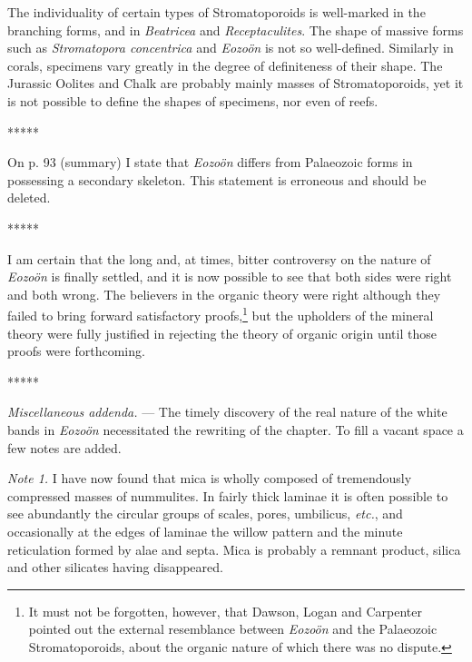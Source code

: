 \documentclass[a4paper, 12pt, oneside]{article}
\begin{document}
The individuality of certain types of Stromatoporoids is well-marked in the branching forms, and in \emph{Beatricea} and \emph{Receptaculites}. The shape of massive forms such as \emph{Stromatopora concentrica} and \emph{Eozoön} is not so well-defined. Similarly in corals, specimens vary greatly in the degree of definiteness of their shape. The Jurassic Oolites and Chalk are probably mainly masses of Stromatoporoids, yet it is not possible to define the shapes of specimens, nor even of reefs.

\centerline{*\hspace{15mm}*\hspace{15mm}*\hspace{15mm}*\hspace{15mm}*}
\bigskip

On p. 93 (summary) I state that \emph{Eozoön} differs from Palaeozoic forms in possessing a secondary skeleton. This statement is erroneous and should be deleted.

\centerline{*\hspace{15mm}*\hspace{15mm}*\hspace{15mm}*\hspace{15mm}*}
\bigskip

I am certain that the long and, at times, bitter controversy on the nature of \emph{Eozoön} is finally settled, and it is now possible to see that both sides were right and both wrong. The believers in the organic theory were right although they failed to bring forward satisfactory proofs,\footnote{It must not be forgotten, however, that Dawson, Logan and Carpenter pointed out the external resemblance between \emph{Eozoön} and the Palaeozoic Stromatoporoids, about the organic nature of which there was no dispute.} but the upholders of the mineral theory were fully justified in rejecting the theory of organic origin until those proofs were forthcoming.

\centerline{*\hspace{15mm}*\hspace{15mm}*\hspace{15mm}*\hspace{15mm}*}
\bigskip

\small
\emph{Miscellaneous addenda.} --- The timely discovery of the real nature of the white bands in \emph{Eozoön} necessitated the rewriting of the chapter. To fill a vacant space a few notes are added.

\emph{Note 1.} I have now found that mica is wholly composed of tremendously compressed masses of nummulites. In fairly thick laminae it is often possible to see abundantly the circular groups of scales, pores, umbilicus, \emph{etc.}, and occasionally at the edges of laminae the willow pattern and the minute reticulation formed by alae and septa. Mica is probably a remnant product, silica and other silicates having disappeared.
\end{document}
